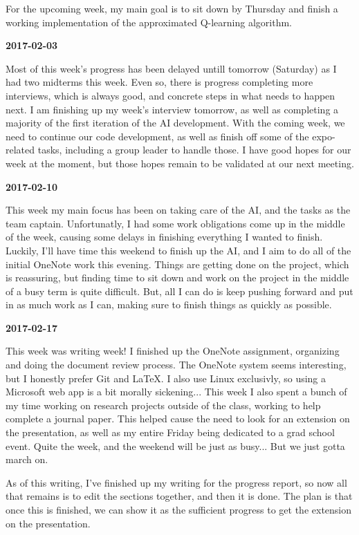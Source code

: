For the upcoming week, my main goal is to sit down by Thursday and finish a working implementation of the approximated Q-learning algorithm.

\textbf{2017-02-03}

Most of this week's progress has been delayed untill tomorrow (Saturday) as I had two midterms this week.
Even so, there is progress completing more interviews, which is always good, and concrete steps in what needs to happen next.
I am finishing up my week's interview tomorrow, as well as completing a majority of the first iteration of the AI development.
With the coming week, we need to continue our code development, as well as finish off some of the expo-related tasks, including a group leader to handle those.
I have good hopes for our week at the moment, but those hopes remain to be validated at our next meeting.

\textbf{2017-02-10}

This week my main focus has been on taking care of the AI, and the tasks as the team captain.
Unfortunatly, I had some work obligations come up in the middle of the week, causing some delays in finishing everything I wanted to finish. Luckily, I'll have time this weekend to finish up the AI, and I aim to do all of the initial OneNote work this evening.
Things are getting done on the project, which is reassuring, but finding time to sit down and work on the project in the middle of a busy term is quite difficult.
But, all I can do is keep pushing forward and put in as much work as I can, making sure to finish things as quickly as possible.

\textbf{2017-02-17}

This week was writing week! I finished up the OneNote assignment, organizing and doing the document review process.
The OneNote system seems interesting, but I honestly prefer Git and LaTeX. I also use Linux exclusivly, so using a Microsoft web app is a bit morally sickening...
This week I also spent a bunch of my time working on research projects outside of the class, working to help complete a journal paper. This helped cause the need to look for an extension on the presentation, as well as my entire Friday being dedicated to a grad school event. Quite the week, and the weekend will be just as busy... But we just gotta march on.

As of this writing, I've finished up my writing for the progress report, so now all that remains is to edit the sections together, and then it is done. The plan is that once this is finished, we can show it as the sufficient progress to get the extension on the presentation.

